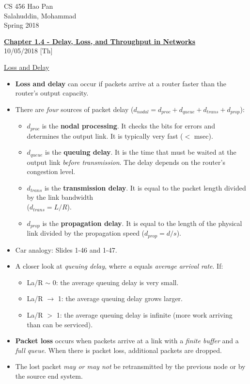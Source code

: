 \documentclass{article}
\begin{document}
\noindent
{CS 456 \hfill Hao Pan}\\
{Salahuddin, Mohammad}\\
{Spring 2018}


\begin{center}
\underline{\large \bf Chapter 1.4 - Delay, Loss, and Throughput in Networks}\\
\noindent
{\hfill 10/05/2018 [Th]}
\end{center}

\underline{Loss and Delay}

\begin{itemize}
\item {\bf Loss and delay} can occur if packets arrive at a router faster than the router's output capacity.
\item There are {\it four} sources of packet delay ($d_{nodal} = d_{proc} + d_{queue} + d_{trans} + d_{prop}$):
\begin{itemize}
\item $d_{proc}$ is the {\bf nodal processing}. It checks the bits for errors and determines the output link. It is typically very fast ($<$ msec).
\item $d_{queue}$ is the {\bf queuing delay}. It is the time that must be waited at the output link {\it before transmission}. The delay depends on the router's congestion level.
\item $d_{trans}$ is the {\bf transmission delay}. It is equal to the packet length divided by the link bandwidth\\ ($d_{trans} = L/R$).
\item $d_{prop}$ is the {\bf propagation delay}. It is equal to the length of the physical link divided by the propagation speed ($d_{prop} = d/s$).
\end{itemize}
\item Car analogy: Slides 1-46 and 1-47.
\item A closer look at {\it queuing delay}, where {\it a} equals {\it average arrival rate}. If:
\begin{itemize}
\item La/R $\sim$ 0: the average queuing delay is very small.
\item La/R $\rightarrow$ 1: the average queuing delay grows larger.
\item La/R $>$ 1: the average queuing delay is infinite (more work arriving than can be serviced).
\end{itemize}
\item {\bf Packet loss} occurs when packets arrive at a link with a {\it finite buffer} and a {\it full queue}. When there is packet loss, additional packets are dropped.
\item The lost packet {\it may or may not} be retransmitted by the previous node or by the source end system.
\end{itemize}
\end{document}
